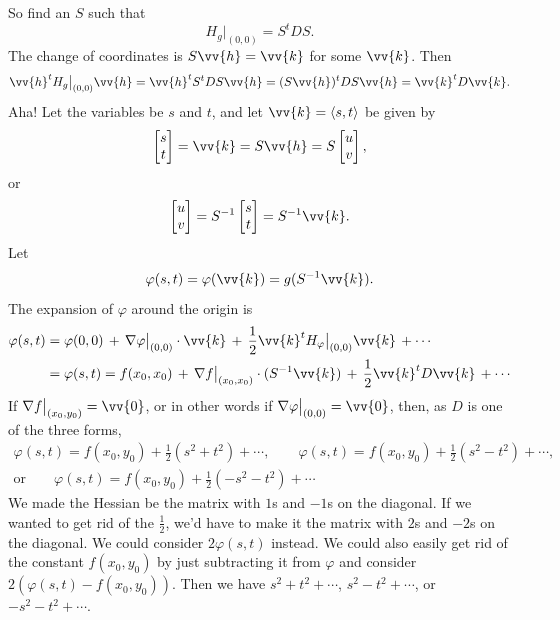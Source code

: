 \documentclass[12pt]{article}
\begin{document}
So find an $S$ such that
\begin{equation*}
H_g\big|_{(0,0)} = S^t D S .
\end{equation*}
The change of coordinates is
$S \vv{h} = \vv{k}$ for some $\vv{k}$.   Then
\begin{equation*}
\vv{h}^t H_g\big|_{(0,0)} \vv{h}
=
\vv{h}^t S^t D S \vv{h}
=
(S\vv{h})^t D S \vv{h}
=
\vv{k}^t D \vv{k} .
\end{equation*}
Aha!  Let the variables be $s$ and $t$, and let
$\vv{k} = \langle s,t \rangle$ be given by
\begin{equation*}
\begin{bmatrix} s \\ t \end{bmatrix}
=
\vv{k} =
S \vv{h} 
=
S
\begin{bmatrix} u \\ v \end{bmatrix} ,
\end{equation*}
or
\begin{equation*}
\begin{bmatrix} u \\ v \end{bmatrix}
=
S^{-1}
\begin{bmatrix} s \\ t \end{bmatrix} 
=
S^{-1} \vv{k} .
\end{equation*}
Let
\begin{equation*}
\varphi(s,t) = \varphi(\vv{k}) = g(S^{-1}\vv{k}) .
\end{equation*}
The expansion of $\varphi$ around the origin
is
\begin{equation*}
\begin{split}
\varphi(s,t) & = \varphi(0,0) \, + \,
\nabla \varphi\big|_{(0,0)} \cdot \vv{k}
\, + \,
\frac{1}{2} \vv{k}^{t} H_\varphi\big|_{(0,0)} \vv{k} \,
+ \cdots
\\
& =
\varphi(s,t) = f(x_0,x_0) \, + \,
\nabla f\big|_{(x_0,x_0)} \cdot (S^{-1} \vv{k})
\, + \,
\frac{1}{2} \vv{k}^{t} D \vv{k} \,
+ \cdots
\end{split}
\end{equation*}
If $\nabla f\big|_{(x_0,y_0)} = \vv{0}$, or in other words if $\nabla
\varphi\big|_{(0,0)} = \vv{0}$, then, as $D$
is one of the three forms,
\begin{multline*}
\varphi(s,t) = f(x_0,y_0) + \frac{1}{2} ( s^2+t^2 ) + \cdots, \qquad
\varphi(s,t) = f(x_0,y_0) + \frac{1}{2} ( s^2-t^2 ) + \cdots, \\
\text{or} \qquad
\varphi(s,t) = f(x_0,y_0) + \frac{1}{2} ( -s^2-t^2 ) + \cdots
\end{multline*}
We made the Hessian be the matrix with $1$s and $-1$s on the diagonal.
If we wanted
to get rid of the $\frac{1}{2}$, we'd have to make it the matrix with $2$s
and $-2$s on the diagonal.
We could consider $2\varphi(s,t)$ instead.
We could also easily get rid of the constant $f(x_0,y_0)$ by just
subtracting it from $\varphi$ and consider $2(\varphi(s,t) - f(x_0,y_0))$.
Then we have $s^2+t^2 + \cdots$,
$s^2-t^2 + \cdots$, or
$-s^2-t^2 + \cdots$.
\end{document}
